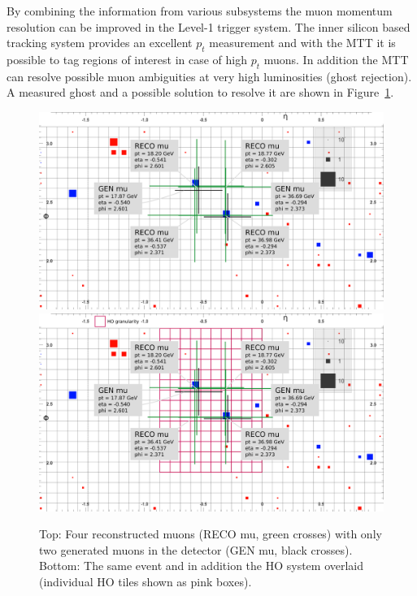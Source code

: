 By combining the information from various subsystems the muon momentum resolution can be improved in the Level-1 trigger system. The inner silicon based tracking system provides 
an excellent $p_t$ measurement and with the MTT it is possible to tag regions of interest in case of high $p_t$ muons. In addition the MTT can resolve possible muon 
ambiguities at very high luminosities (ghost rejection). A measured ghost and a possible solution to resolve it are shown in Figure~\ref{fig:ghosts}.
\begin{figure}[htbp]
\centering
\includegraphics[width=\textwidth]{Figures/pooth/GhostEvent01.png}
\includegraphics[width=\textwidth]{Figures/pooth/GhostEvent02.png}
\caption{Top: Four reconstructed muons (RECO mu, green crosses) with only two generated muons in the detector (GEN mu, black crosses). 
Bottom: The same event and in addition the HO system overlaid (individual HO tiles shown as pink boxes).} 
\label{fig:ghosts}
\end{figure}
